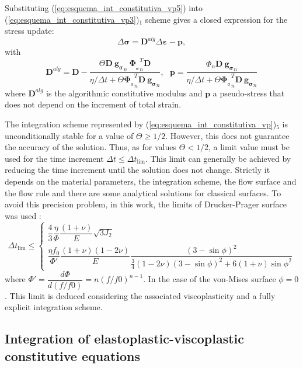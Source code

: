 \documentclass[Journal,letterpaper]{ascelike-new}
\newcommand{\dgds}{\boldsymbol{g_\sigma}}
\newcommand{\dPhidsl}{\boldsymbol{\Phi_{_\sigma}}}
\newcommand{\Dsdee}{\boldsymbol{D}}
\newcommand{\strain}{\boldsymbol{\varepsilon}}
\newcommand{\stress}{\boldsymbol{\sigma}}
\begin{document}
Substituting (\ref{eq:esquema_int_constitutiva_vp5}) into (\ref{eq:esquema_int_constitutiva_vp3})$_1$ scheme gives a closed expression for the stress update:
\begin{equation}
	\label{eq:esquema_int_constitutiva_vp6}
	\Delta \stress = \Dsdee^{alg} \Delta \strain - \boldsymbol p,
\end{equation}
with
\begin{equation}
	\label{eq:esquema_int_constitutiva_vp6}
	\Dsdee^{alg} = \Dsdee - \dfrac{\Theta \Dsdee~\dgds_n~\dPhidsl_n^T \Dsdee}{\eta/\Delta t+ \Theta \dPhidsl_n^T\Dsdee~\dgds_n},~~~\boldsymbol p = \dfrac{\Phi_n \Dsdee ~\dgds_n}{\eta/\Delta t+ \Theta \dPhidsl_n^T\Dsdee~\dgds_n}
\end{equation}
where $\Dsdee^{alg}$ is the algorithmic constitutive modulus and $\boldsymbol p$ a pseudo-stress that does not depend on the increment of total strain.

The integration scheme represented by (\ref{eq:esquema_int_constitutiva_vp})$_5$ is unconditionally stable for a value of $\Theta \geq 1/2$. However, this does not guarantee the accuracy of the solution. Thus, as for values $\Theta < 1/2$, a limit value must be used for the time increment $\Delta t \leq \Delta t_{\text{lim}}$. This limit can generally be achieved by reducing the time increment until the solution does not change. Strictly it depends on the material parameters, the integration scheme, the flow surface and the flow rule and there are some analytical solutions for classical surfaces. To avoid this precision problem, in this work, the limits of Drucker-Prager surface was used \cite{cormeau1975}:
\begin{equation}
	\label{eq:deltatmin_dp}
	\Delta t_{\text{lim}} \leq \left\{ 
	\begin{array}{lcl} 
		\dfrac{4}{3}\dfrac{\eta}{\Phi}\dfrac{(1+\nu)}{E} {\sqrt{3J_2}} \\
		\dfrac{\eta f_0}{\Phi'}\dfrac{(1+\nu)(1-2\nu)}{E}\dfrac{(3-\sin{\phi})^2}{\frac{3}{4}(1-2\nu)(3-\sin{\phi})^2 + 6(1+\nu)\sin{\phi}^2}
	\end{array} \right.
\end{equation}
where $\Phi'= \dfrac{d \Phi}{d(f/f0)} = n(f/f0)^{n-1}$. In the case of the von-Mises surface $\phi = 0$. This limit is deduced considering the associated viscoplasticity and a fully explicit integration scheme. 

\subsection{Integration of elastoplastic-viscoplastic constitutive equations}
\end{document}
